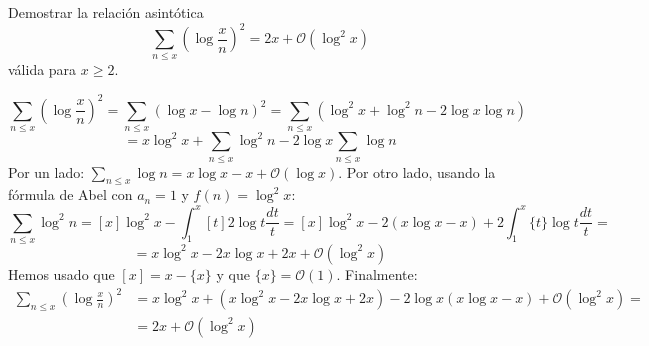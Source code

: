 \documentclass[twoside]{article}
\providecommand{\bo}[1]{\mathcal{O}\left(#1\right)}
\begin{document}
\newpage

\begin{ejercicio}{3}
Demostrar la relación asintótica
\[ \sum_{n≤x} \left(\log \frac{x}{n}\right)^2 = 2x + \bo{\log^2 x} \]
válida para $x ≥ 2$.
\end{ejercicio}
\begin{solucion}
\[ \sum_{n≤x} \left(\log \frac{x}{n}\right)^2 = \sum_{n≤x} \left(\log x - \log n\right)^2 = \sum_{n≤x} \left(\log^2 x + \log^2 n-2 \log x \log n\right)\]
\[ = x \log^2 x + \sum_{n≤x} \log^2 n - 2 \log x \sum_{n≤x} \log n\]
Por un lado: $\sum_{n≤x} \log n = x \log x - x + \mathcal{O}(\log x)$. Por otro lado, usando la fórmula de Abel con $a_n=1$ y $f(n)=\log^2 x$:
\[ \sum_{n≤x} \log^2 n = [x]\log^2 x - \int_1^x [t] 2 \log t \frac{dt}{t} = [x] \log^2 x - 2 (x \log x - x) + 2\int_1^x \{t\}\log t \frac{dt}{t} = \]
\[ = x \log^2 x -2x \log x +2x + \bo{\log^2 x} \]
Hemos usado que $[x]=x-\{x\}$ y que $\{x\}=\bo{1}$. Finalmente:
\begin{align*}
	\sum_{n≤x} \left(\log \frac{x}{n}\right)^2 & = x \log^2 x + ( x \log^2 x -2x \log x +2x) - 2 \log x (x \log x - x) + \bo{\log^2 x} =\\
	& = 2x + \bo{\log^2 x}
\end{align*}
\end{solucion}

\newpage
\end{document}
